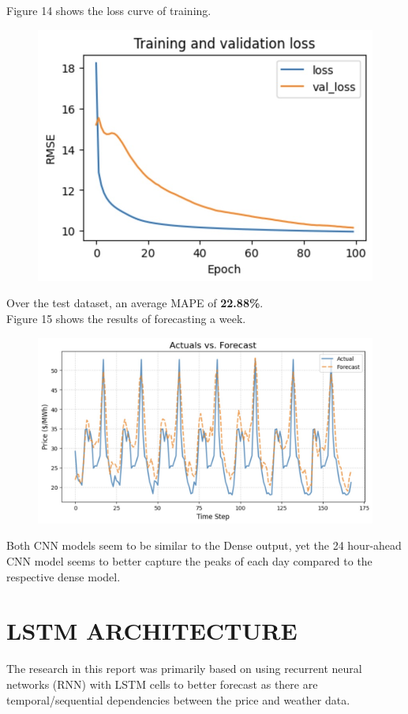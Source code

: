 \documentclass[9pt,a4paper,twoside]{rho}
\begin{document}
\noindent Figure 14 shows the loss curve of training.
\begin{figure}[H]
	\centering
	\includegraphics[width=0.8\columnwidth]{Figures/CNN_24_24_Learning.png}
\end{figure}

\noindent Over the test dataset, an average MAPE of \textbf{22.88\%}.\\

\noindent Figure 15 shows the results of forecasting a week.
\begin{figure}[H]
	\centering
	\includegraphics[width=0.8\columnwidth]{Figures/CNN_24_24_Results.png}
\end{figure}

\noindent Both CNN models seem to be similar to the Dense output, yet the 24 hour-ahead CNN model seems to better capture the peaks of each day compared to the respective dense model.

\section*{LSTM ARCHITECTURE}

The research in this report was primarily based on using recurrent neural networks (RNN) with LSTM cells to better forecast as there are temporal/sequential dependencies between the price and weather data.
\end{document}
